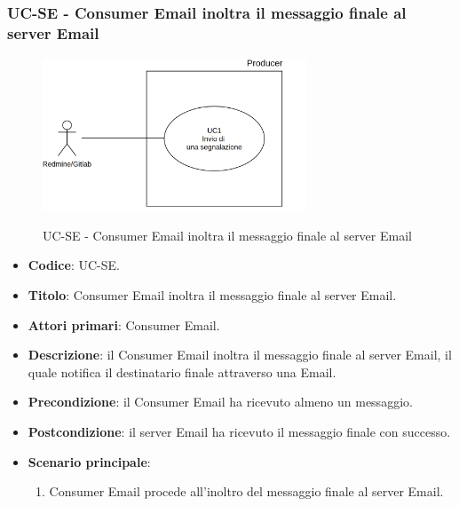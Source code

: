 \subsubsection{UC\theuccount-SE - Consumer Email inoltra il messaggio finale al server Email}
	\begin{figure}[H]
		\centering
		\includegraphics[width=0.7\textwidth]{img/UC1.png}\\
		\caption{UC\theuccount-SE - Consumer Email inoltra il messaggio finale al server Email}
	\end{figure}
	\begin{itemize}
		\item \textbf{Codice}: UC\theuccount-SE.
		\item \textbf{Titolo}: Consumer Email inoltra il messaggio finale al server Email.
		\item \textbf{Attori primari}: Consumer Email.
		\item \textbf{Descrizione}: il Consumer Email inoltra il messaggio finale al server Email, il quale notifica il destinatario finale attraverso una Email.
		\item \textbf{Precondizione}: il Consumer Email ha ricevuto almeno un messaggio.
		\item \textbf{Postcondizione}: il server Email ha ricevuto il messaggio finale con successo.
		\item \textbf{Scenario principale}: 
		\begin{enumerate}
			\item Consumer Email procede all'inoltro del messaggio finale al server Email.
		\end{enumerate}
		
	\end{itemize}